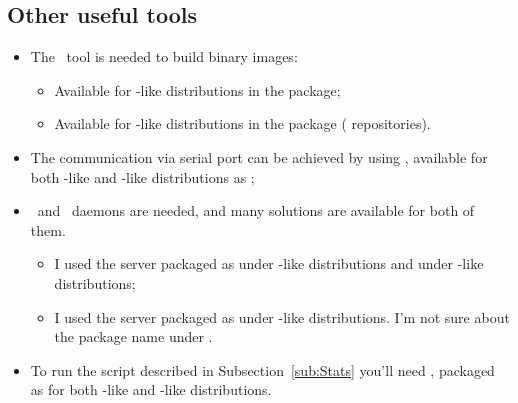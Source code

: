 
\subsection{ Other useful tools } \label{sub:OtherTools}

    \begin{itemize}

    \item  The \mkimage\ tool is needed to build binary images:

        \begin{itemize}
        \item   Available for \Debian-like distributions in the
                 package;
        \item   Available for \RedHat-like distributions in the
                 package (
                repositories).
        \end{itemize}

    \item   The communication via serial port can be achieved by using
            \Minicom, available for both \Debian-like and \RedHat-like
            distributions as ;

\newpage
    \item   \BootP\ and \TFTP\ daemons are needed, and many solutions are
            available for both of them.
        \begin{itemize}
        \item   I used the server packaged as 
                under \Debian-like distributions and
                 under \RedHat-like
                distributions;
        \item   I used the server packaged as 
                under \Debian-like distributions. I'm not sure about
                the package name under \RedHat.
        \end{itemize}

    \item   To run the script described in Subsection~\ref{sub:Stats}
            you'll need , packaged as
             for both \Debian-like and
            \RedHat-like distributions.

    \end{itemize}

